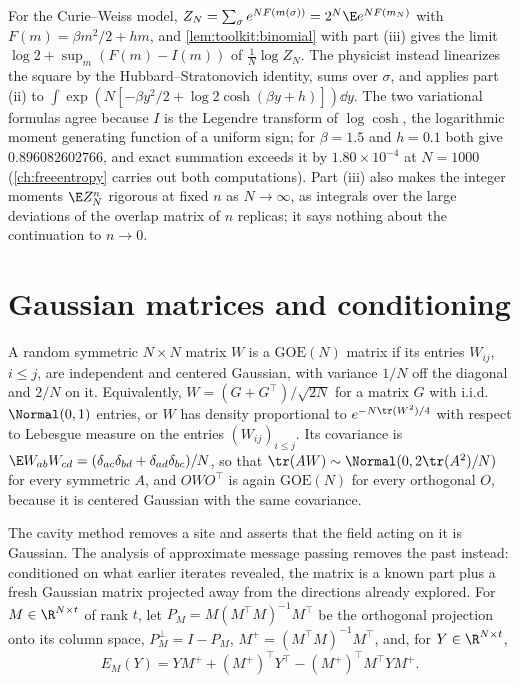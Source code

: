 \begin{refsection}
For the Curie--Weiss model, $Z_N=\sum_\sigma e^{NF(m(\sigma))}=2^N\E e^{NF(m_N)}$ with $F(m)=\beta m^2/2+hm$, and \cref{lem:toolkit:binomial} with part (iii) gives the limit $\log2+\sup_m(F(m)-I(m))$ of $\frac1N\log Z_N$. The physicist instead linearizes the square by the Hubbard--Stratonovich identity, sums over $\sigma$, and applies part (ii) to $\int\exp(N[-\beta y^2/2+\log2\cosh(\beta y+h)])\dd y$. The two variational formulas agree because $I$ is the Legendre transform of $\log\cosh$, the logarithmic moment generating function of a uniform sign; for $\beta=1.5$ and $h=0.1$ both give $0.896082602766$, and exact summation exceeds it by $1.80\times10^{-4}$ at $N=1000$ (\cref{ch:freeentropy} carries out both computations). Part (iii) also makes the integer moments $\E Z_N^n$ rigorous at fixed $n$ as $N\to\infty$, as integrals over the large deviations of the overlap matrix of $n$ replicas; it says nothing about the continuation to $n\to0$.

\section{Gaussian matrices and conditioning}\label{sec:toolkit:conditioning}

\begin{definition}\label{def:toolkit:goe}
A random symmetric $N\times N$ matrix $W$ is a $\mathrm{GOE}(N)$ matrix if its entries $W_{ij}$, $i\le j$, are independent and centered Gaussian, with variance $1/N$ off the diagonal and $2/N$ on it. Equivalently, $W=(G+G^\top)/\sqrt{2N}$ for a matrix $G$ with i.i.d.\ $\Normal(0,1)$ entries, or $W$ has density proportional to $e^{-N\tr(W^2)/4}$ with respect to Lebesgue measure on the entries $(W_{ij})_{i\le j}$. Its covariance is $\E W_{ab}W_{cd}=(\delta_{ac}\delta_{bd}+\delta_{ad}\delta_{bc})/N$, so that $\tr(AW)\sim\Normal(0,2\tr(A^2)/N)$ for every symmetric $A$, and $OWO^\top$ is again $\mathrm{GOE}(N)$ for every orthogonal $O$, because it is centered Gaussian with the same covariance.
\end{definition}

The cavity method removes a site and asserts that the field acting on it is Gaussian. The analysis of approximate message passing removes the past instead: conditioned on what earlier iterates revealed, the matrix is a known part plus a fresh Gaussian matrix projected away from the directions already explored. For $M\in\R^{N\times t}$ of rank $t$, let $P_M=M(M^\top M)^{-1}M^\top$ be the orthogonal projection onto its column space, $P_M^\perp=I-P_M$, $M^+=(M^\top M)^{-1}M^\top$, and, for $Y\in\R^{N\times t}$,
\begin{equation}\label{eq:toolkit:condmean}
E_M(Y)=YM^++(M^+)^\top Y^\top-(M^+)^\top M^\top YM^+.
\end{equation}


\end{refsection}
